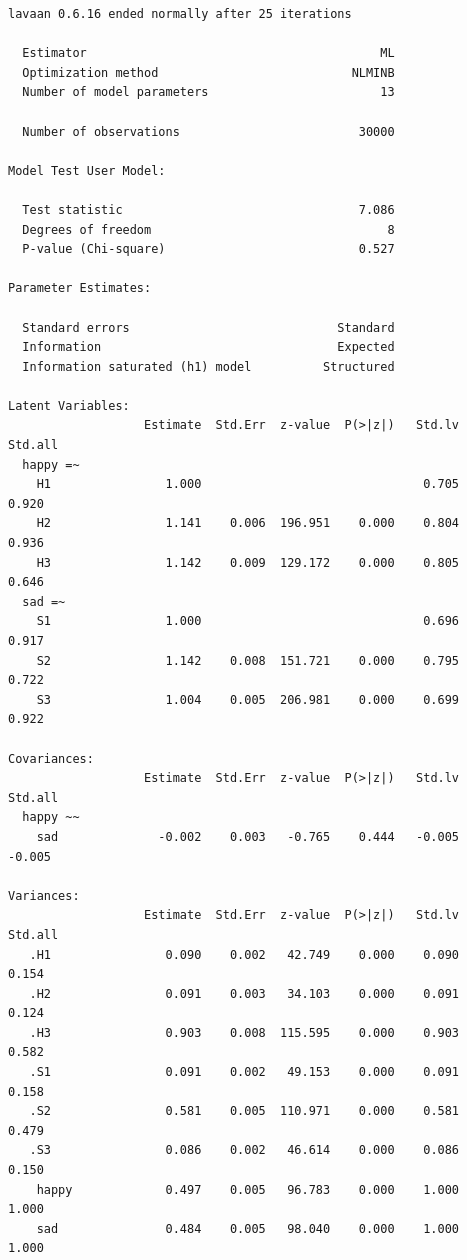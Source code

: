 \documentclass[
  letterpaper,
  DIV=11,
  numbers=noendperiod]{scrreprt}
\begin{document}
\begin{verbatim}
lavaan 0.6.16 ended normally after 25 iterations

  Estimator                                         ML
  Optimization method                           NLMINB
  Number of model parameters                        13

  Number of observations                         30000

Model Test User Model:
                                                      
  Test statistic                                 7.086
  Degrees of freedom                                 8
  P-value (Chi-square)                           0.527

Parameter Estimates:

  Standard errors                             Standard
  Information                                 Expected
  Information saturated (h1) model          Structured

Latent Variables:
                   Estimate  Std.Err  z-value  P(>|z|)   Std.lv  Std.all
  happy =~                                                              
    H1                1.000                               0.705    0.920
    H2                1.141    0.006  196.951    0.000    0.804    0.936
    H3                1.142    0.009  129.172    0.000    0.805    0.646
  sad =~                                                                
    S1                1.000                               0.696    0.917
    S2                1.142    0.008  151.721    0.000    0.795    0.722
    S3                1.004    0.005  206.981    0.000    0.699    0.922

Covariances:
                   Estimate  Std.Err  z-value  P(>|z|)   Std.lv  Std.all
  happy ~~                                                              
    sad              -0.002    0.003   -0.765    0.444   -0.005   -0.005

Variances:
                   Estimate  Std.Err  z-value  P(>|z|)   Std.lv  Std.all
   .H1                0.090    0.002   42.749    0.000    0.090    0.154
   .H2                0.091    0.003   34.103    0.000    0.091    0.124
   .H3                0.903    0.008  115.595    0.000    0.903    0.582
   .S1                0.091    0.002   49.153    0.000    0.091    0.158
   .S2                0.581    0.005  110.971    0.000    0.581    0.479
   .S3                0.086    0.002   46.614    0.000    0.086    0.150
    happy             0.497    0.005   96.783    0.000    1.000    1.000
    sad               0.484    0.005   98.040    0.000    1.000    1.000
\end{verbatim}
\end{document}
